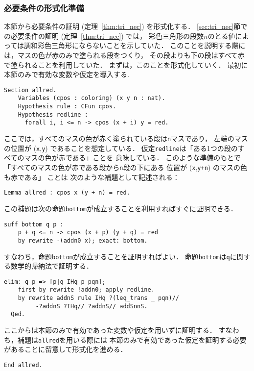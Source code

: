 \subsubsection{必要条件の形式化準備}
本節から必要条件の証明 (定理~\ref{thm:tri_nec}) を形式化する．
\ref{sec:tri_nec}節での必要条件の証明 (定理~\ref{thm:tri_nec}) では，
彩色三角形の段数$n$のとる値によっては調和彩色三角形にならないことを示していた．
このことを説明する際には，マスの色が赤のみで塗られる段をつくり，
その段よりも下の段はすべて赤で塗られることを利用していた．
まずは，このことを形式化していく．
最初に本節のみで有効な変数や仮定を導入する.
\begin{lstlisting}[language=Coq]
  Section allred.
    Variables (cpos : coloring) (x y n : nat).
    Hypothesis rule : CFun cpos.
    Hypothesis redline :
      forall i, i <= n -> cpos (x + i) y = red.
\end{lstlisting}
ここでは，すべてのマスの色が赤く塗られている段は{\tt{n}}マスであり，
左端のマスの位置が ({\tt{x}},{\tt{y}}) であることを想定している．
仮定{\tt{redline}}は「ある1つの段のすべてのマスの色が赤である」ことを
意味している．
このような準備のもとで
「すべてのマスの色が赤である段から{\tt{n}}段の下にある
  位置が ({\tt{x}},{\tt{y+n}}) のマスの色も赤である」
ことは
次のような補題として記述される：
\begin{lstlisting}[language=Coq]
  Lemma allred : cpos x (y + n) = red.
\end{lstlisting}
この補題は次の命題{\tt{bottom}}が成立することを利用すればすぐに証明できる．
\begin{lstlisting}[language=Coq]
  suff bottom q p :
    p + q <= n -> cpos (x + p) (y + q) = red
    by rewrite -(addn0 x); exact: bottom.
\end{lstlisting}
すなわち，命題{\tt{bottom}}が成立することを証明すればよい．
命題{\tt{bottom}}は{\tt{q}}に関する数学的帰納法で証明する．
\begin{lstlisting}[language=Coq]
    elim: q p => [p|q IHq p pqn];
    first by rewrite !addn0; apply redline.
    by rewrite addnS rule IHq ?(leq_trans _ pqn)//
         -?addnS ?IHq// ?addnS// addSnnS.
  Qed.
\end{lstlisting}

ここからは本節のみで有効であった変数や仮定を用いずに証明する．
すなわち，補題は{\tt{allred}}を用いる際には
本節のみで有効であった仮定を証明する必要があることに留意して形式化を進める．
\begin{lstlisting}[language=Coq]
  End allred.     
\end{lstlisting}

